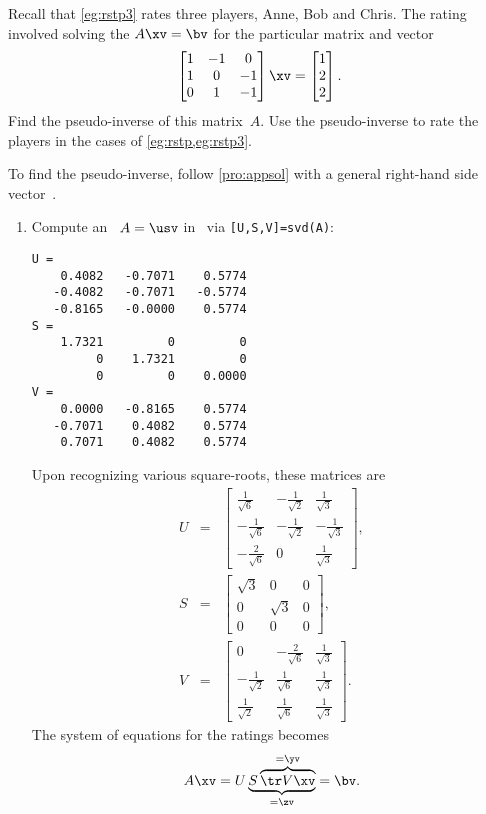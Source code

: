 \begin{example}  
Recall that \cref{eg:rstp3} rates three  players, Anne, Bob and Chris.  
The rating involved solving the  \(A\xv=\bv\) for the particular matrix and vector
\begin{equation*}
\begin{bmatrix} 1&-1&0\\1&0&-1\\0&1&-1 \end{bmatrix}\xv
=\begin{bmatrix} 1\\2\\2 \end{bmatrix}.
\end{equation*}
Find the pseudo-inverse of this matrix~\(A\).
Use the pseudo-inverse to rate the players in the cases of \cref{eg:rstp,eg:rstp3}.
\begin{solution} 
To find the pseudo-inverse, follow \cref{pro:appsol} with a general right-hand side vector~\bv.
\begin{enumerate}
\item Compute an \svd\ \(A=\usv\) in \script\ via \verb|[U,S,V]=svd(A)|:
\begin{verbatim}
U =
    0.4082   -0.7071    0.5774
   -0.4082   -0.7071   -0.5774
   -0.8165   -0.0000    0.5774
S =
    1.7321         0         0
         0    1.7321         0
         0         0    0.0000
V =
    0.0000   -0.8165    0.5774
   -0.7071    0.4082    0.5774
    0.7071    0.4082    0.5774
\end{verbatim}
Upon recognizing various square-roots, these matrices are
\begin{eqnarray*}
U&=&\begin{bmatrix} \frac1{\sqrt6}&-\frac1{\sqrt2}&\frac1{\sqrt3}
\\-\frac1{\sqrt6}&-\frac1{\sqrt2}&-\frac1{\sqrt3}
\\-\frac2{\sqrt6}&0&\frac1{\sqrt3} \end{bmatrix},
\\
S&=&\begin{bmatrix} \sqrt3&0&0
\\0&\sqrt3&0
\\0&0&0 \end{bmatrix},
\\
V&=&\begin{bmatrix} 0&-\frac2{\sqrt6}&\frac1{\sqrt3}
\\-\frac1{\sqrt2}&\frac1{\sqrt6}&\frac1{\sqrt3}
\\\frac1{\sqrt2}&\frac1{\sqrt6}&\frac1{\sqrt3} \end{bmatrix}.
\end{eqnarray*}
The system of equations for the ratings becomes
\begin{equation*}
A\xv=
U\underbrace{S\overbrace{\tr V\xv}^{=\yv}}_{=\zv}
=\bv.
\end{equation*}


\end{enumerate}
\end{solution}
\end{example}
